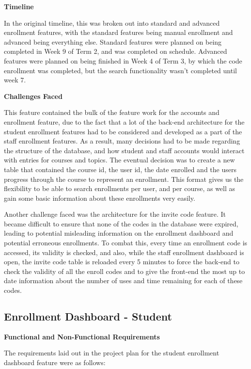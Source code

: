 \textbf{Timeline}

In the original timeline, this was broken out into standard and advanced enrollment features, with the standard features being manual enrollment and advanced being everything else. Standard features were planned on being completed in Week 9 of Term 2, and was completed on schedule. Advanced features were planned on being finished in Week 4 of Term 3, by which the code enrollment was completed, but the search functionality wasn't completed until week 7.

\textbf{Challenges Faced}

This feature contained the bulk of the feature work for the accounts and enrollment feature, due to the fact that a lot of the back-end architecture for the student enrollment features had to be considered and developed as a part of the staff enrollment features. As a result, many decisions had to be made regarding the structure of the database, and how student and staff accounts would interact with entries for courses and topics. The eventual decision was to create a new table that contained the course id, the user id, the date enrolled and the users progress through the course to represent an enrollment. This format gives us the flexibility to be able to search enrollments per user, and per course, as well as gain some basic information about these enrollments very easily.

Another challenge faced was the architecture for the invite code feature. It became difficult to ensure that none of the codes in the database were expired, leading to potential misleading information on the enrollment dashboard and potential erroneous enrollments. To combat this, every time an enrollment code is accessed, its validity is checked, and also, while the staff enrollment dashboard is open, the invite code table is reloaded every 5 minutes to force the back-end to check the validity of all the enroll codes and to give the front-end the most up to date information about the number of uses and time remaining for each of these codes.

\subsection{Enrollment Dashboard - Student}
\textbf{Functional and Non-Functional Requirements}

The requirements laid out in the project plan for the student enrollment dashboard feature were as follows:

